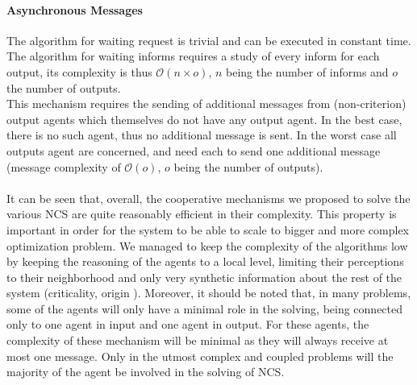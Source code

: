 \paragraph*{Asynchronous Messages}

The algorithm for waiting request is trivial and can be executed in constant time. The algorithm for waiting informs requires a study of every inform for each output, its complexity is thus $\mathcal{O}(n \times o)$, $n$ being the number of informs and $o$ the number of outputs.\\
This mechanism requires the sending of additional messages from (non-criterion) output agents which themselves do not have any output agent. In the best case, there is no such agent, thus no additional message is sent. In the worst case all outputs agent are concerned, and need each to send one additional message (message complexity of $\mathcal{O}(o)$, $o$ being the number of outputs).

\paragraph*{}
It can  be seen that, overall, the cooperative mechanisms we proposed to solve the various NCS are quite reasonably efficient in their complexity. This property is important in order for the system to be able to scale to bigger and more complex optimization problem. We managed to keep the complexity of the algorithms low by keeping the reasoning of the agents to a local level, limiting their perceptions to their neighborhood and only very synthetic information about the rest of the system (criticality, origin ). Moreover, it should be noted that, in many problems, some of the agents will only have a minimal role in the solving, being connected only to one agent in input and one agent in output. For these agents, the complexity of these mechanism will be minimal as they will always receive at most one message. Only in the utmost complex and coupled problems will the majority of the agent be involved in the solving of NCS.

